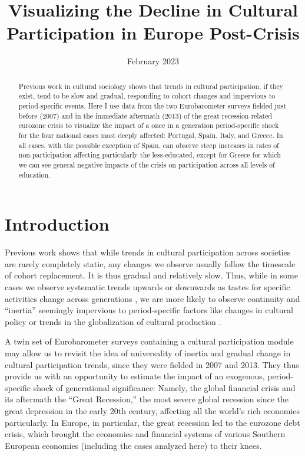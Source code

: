 \documentclass{article}
\title{Visualizing the Decline in Cultural Participation in Europe Post-Crisis}
\date{February 2023}
\begin{document}
\maketitle

\begin{abstract}
    Previous work in cultural sociology shows that trends in cultural participation, if they exist, tend to be slow and gradual, responding to cohort changes and impervious to period-specific events. Here I use data from the two Eurobarometer surveys fielded just before (2007) and in the immediate aftermath (2013) of the great recession related eurozone crisis to visualize the impact of a once in a generation period-specific shock for the four national cases most deeply affected: Portugal, Spain, Italy, and Greece. In all cases, with the possible exception of Spain, can observe steep increases in rates of non-participation affecting particularly the less-educated, except for Greece for which we can see general negative impacts of the crisis on participation across all levels of education. \end{abstract}

\section{Introduction}
Previous work shows that while trends in cultural participation across societies are rarely completely static, any changes we observe usually follow the timescale of cohort replacement. It is thus gradual and relatively slow. Thus, while in some cases we observe systematic trends upwards or downwards as tastes for specific activities change across generations \citep{dimaggio2004arts}, we are more likely to observe continuity and ``inertia'' seemingly impervious to period-specific factors like changes in cultural policy or trends in the globalization of cultural production \citep{coulangeon2013changing, lopez2005exclusive}.

A twin set of Eurobarometer surveys containing a cultural participation module may allow us to revisit the idea of universality of inertia and gradual change in cultural participation trends, since they were fielded in 2007 and 2013. They thus provide us with an opportunity to estimate the impact of an exogenous, period-specific shock of generational significance: Namely, the global financial crisis and its aftermath the ``Great Recession,'' the most severe global recession since the great depression in the early 20th century,  affecting all the world's rich economies particularly. In Europe, in particular, the great recession led to the eurozone debt crisis, which brought the economies and financial systems of various Southern European economies (including the cases analyzed here) to their knees. 
\end{document}
